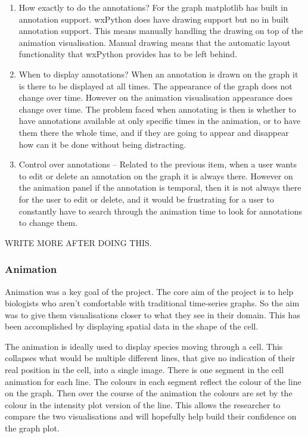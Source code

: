 \begin{enumerate}
\item How exactly to do the annotations?  For the graph matplotlib has built in annotation support.  wxPython does have drawing support but no in built annotation support.  This means manually handling the drawing on top of the animation visualisation.  Manual drawing means that the automatic layout functionality that wxPython provides has to be left behind.
\item When to display annotations?  When an annotation is drawn on the graph it is there to be displayed at all times.  The appearance of the graph does not change over time.  However on the animation visualisation appearance does change over time.  The problem faced when annotating is then is whether to have annotations available at only specific times in the animation, or to have them there the whole time, and if they are going to appear and disappear how can it be done without being distracting.
\item Control over annotations -- Related to the previous item, when a user wants to edit or delete an annotation on the graph it is always there.  However on the animation panel if the annotation is temporal, then it is not always there for the user to edit or delete, and it would be frustrating for a user to constantly have to search through the animation time to look for annotations to change them.
\end{enumerate}

WRITE MORE AFTER DOING THIS.

\subsubsection{Animation}

Animation was a key goal of the project.  The core aim of the project is to help biologists who aren't comfortable with traditional time-series graphs.  So the aim was to give them visualisations closer to what they see in their domain.  This has been accomplished by displaying spatial data in the shape of the cell.

The animation is ideally used to display species moving through a cell.  This collapses what would be multiple different lines, that give no indication of their real position in the cell, into a single image.  There is one segment in the cell animation for each line.  The colours in each segment reflect the colour of the line on the graph.  Then over the course of the animation the colours are set by the colour in the intensity plot version of the line.  This allows the researcher to compare the two visualisations and will hopefully help build their confidence on the graph plot.

